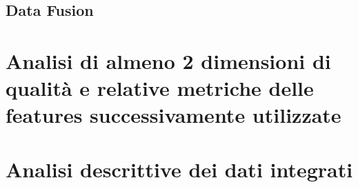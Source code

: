 \section{Data Fusion}

\chapter{Analisi di almeno 2 dimensioni di qualità e relative metriche delle features successivamente utilizzate}

\chapter{Analisi descrittive dei dati integrati}
